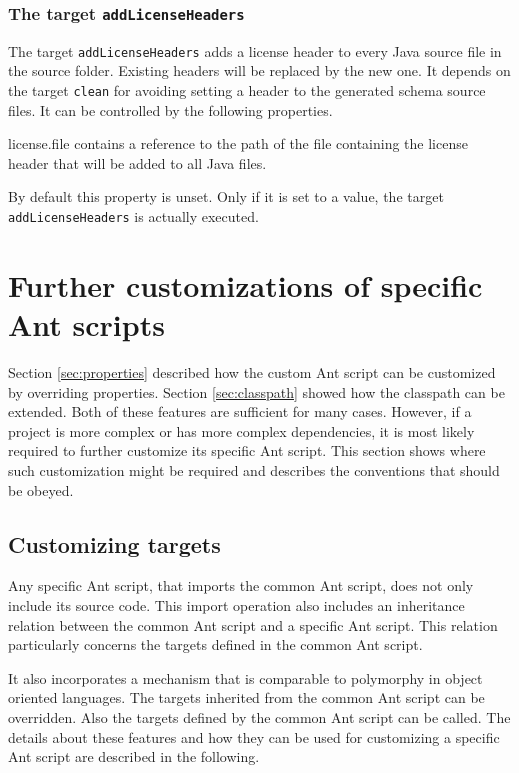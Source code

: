 \documentclass[a4paper,twoside,11pt,bibtotoc]{article}
\begin{document}
\subsubsection{The target \texttt{addLicenseHeaders}}
The target \texttt{addLicenseHeaders} adds a license header to every Java source file in the source folder.
Existing headers will be replaced by the new one.
It depends on the target \texttt{clean} for avoiding setting a header to the generated schema source files.
It can be controlled by the following properties.
\begin{description*}
	\item[license.file] contains a reference to the path of the file containing the license header that will be added to all Java files.\par By default this property is unset. Only if it is set to a value, the target \texttt{addLicenseHeaders} is actually executed.
\end{description*}

\section{Further customizations of specific Ant scripts}
\label{sec:customize}
Section \ref{sec:properties} described how the custom Ant script can be customized by overriding properties.
Section \ref{sec:classpath} showed how the classpath can be extended.
Both of these features are sufficient for many cases.
However, if a project is more complex or has more complex dependencies, it is most likely required to further customize its specific Ant script.
This section shows where such customization might be required and describes the conventions that should be obeyed.

\subsection{Customizing targets}
Any specific Ant script, that imports the common Ant script, does not only include its source code.%
This import operation also includes an inheritance relation between the common Ant script and a specific Ant script.
This relation particularly concerns the targets defined in the common Ant script.

It also incorporates a mechanism that is comparable to polymorphy in object oriented languages.
The targets inherited from the common Ant script can be overridden.
Also the targets defined by the common Ant script can be called.
The details about these features and how they can be used for customizing a specific Ant script are described in the following.
\end{document}
